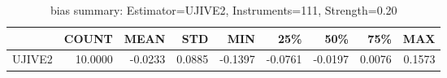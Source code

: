 \begin{table}[ht]
\centering
\caption{bias summary: Estimator=UJIVE2, Instruments=111, Strength=0.20}
\begin{tabular}{lrrrrrrrr}
\toprule
 & COUNT & MEAN & STD & MIN & 25\% & 50\% & 75\% & MAX \\
\midrule
UJIVE2 & 10.0000 & -0.0233 & 0.0885 & -0.1397 & -0.0761 & -0.0197 & 0.0076 & 0.1573 \\
\bottomrule
\end{tabular}
\end{table}
